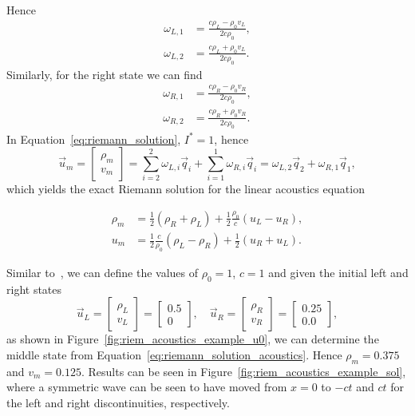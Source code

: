 Hence
\begin{align}
	\omega_{L,1} &= \frac{c \rho_L - \rho_0 v_L}{2 c \rho_0}, \\
	\omega_{L,2} &= \frac{c \rho_L + \rho_0 v_L}{2 c \rho_0}.
\end{align}
Similarly, for the right state we can find
\begin{align}
	\omega_{R,1} &= \frac{c \rho_R - \rho_0 v_R}{2 c \rho_0}, \\
	\omega_{R,2} &= \frac{c \rho_R + \rho_0 v_R}{2 c \rho_0}.
\end{align}
In Equation~\ref{eq:riemann_solution}, $I^*=1$, hence
\begin{equation}
	\vec u_m = 
	\begin{bmatrix}
		\rho_m \\ v_m
	\end{bmatrix} =  \sum_{i=2}^2 \omega_{L,i} \vec q_i + \sum_{i=1}^{1} \omega_{R,i} \vec q_i = 
	\omega_{L,2} \vec q_2 + \omega_{R,1} \vec q_1,
\end{equation}
which yields the exact Riemann solution for the linear acoustics equation
\begin{eqBox}
	\begin{align}
		\rho_m &= \frac{1}{2} (\rho_R+\rho_L) + \frac{1}{2}\frac{\rho_0}{c} (u_L-u_R), \\
		u_m &= \frac{1}{2}\frac{c}{\rho_0}(\rho_L-\rho_R) + \frac{1}{2} (u_R+u_L).
		\label{eq:riemann_solution_acoustics}
	\end{align}
\end{eqBox}
Similar to~\cite{toro_riemann}, we can define the values of $\rho_0=1$, $c=1$ and given the initial left and right states
\begin{equation}
	\vec u_L = 
	\begin{bmatrix}
		\rho_L \\ v_L
	\end{bmatrix}
	 = 	
	 \begin{bmatrix}
		0.5 \\ 0
	\end{bmatrix},
	\quad
	\vec u_R = 
	\begin{bmatrix}
		\rho_R \\ v_R
	\end{bmatrix}
	 = 	
	 \begin{bmatrix}
		0.25 \\ 0.0
	\end{bmatrix},
\end{equation}
as shown in Figure~\ref{fig:riem_acoustics_example_u0}, we can determine the middle state from Equation~\ref{eq:riemann_solution_acoustics}. Hence $\rho_m=0.375$ and $v_m=0.125$. Results can be seen in Figure~\ref{fig:riem_acoustics_example_sol}, where a symmetric wave can be seen to have moved from $x=0$ to $-ct$ and $ct$ for the left and right discontinuities, respectively. 
